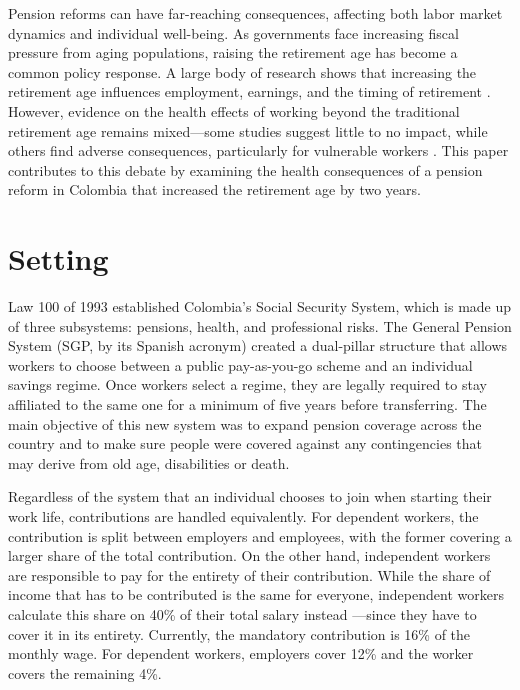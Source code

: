 \documentclass[12pt, a4paper]{article}
\begin{document}
Pension reforms can have far-reaching consequences, affecting both labor market dynamics and individual well-being. As governments face increasing fiscal pressure from aging populations, raising the retirement age has become a common policy response. A large body of research shows that increasing the retirement age influences employment, earnings, and the timing of retirement \citep{fisher2010pension,geyer2020labor,hernaes2016pension,sanchez2014delaying}. However, evidence on the health effects of working beyond the traditional retirement age remains mixed—some studies suggest little to no impact, while others find adverse consequences, particularly for vulnerable workers \citep{coe2011retirement,hagen2018effects,maimaris2010impact,pilipiec2021effect}. This paper contributes to this debate by examining the health consequences of a pension reform in Colombia that increased the retirement age by two years.


\section{Setting \label{sec:setting}}

Law 100 of 1993 established Colombia’s Social Security System, which is made up of three subsystems: pensions, health, and professional risks. The General Pension System (SGP, by its Spanish acronym) created a dual-pillar structure that allows workers to choose between a public pay-as-you-go scheme and an individual savings regime. Once workers select a regime, they are legally required to stay affiliated to the same one for a minimum of five years before transferring. The main objective of this new system was to expand pension coverage across the country and to make sure people were covered against any contingencies that may derive from old age, disabilities or death.

Regardless of the system that an individual chooses to join when starting their work life, contributions are handled equivalently. For dependent workers, the contribution is split between employers and employees, with the former covering a larger share of the total contribution. On the other hand, independent workers are responsible to pay for the entirety of their contribution. While the share of income that has to be contributed is the same for everyone, independent workers calculate this share on 40\% of their total salary instead ---since they have to cover it in its entirety. Currently, the mandatory contribution is 16\% of the monthly wage. For dependent workers, employers cover 12\% and the worker covers the remaining 4\%.
\end{document}
